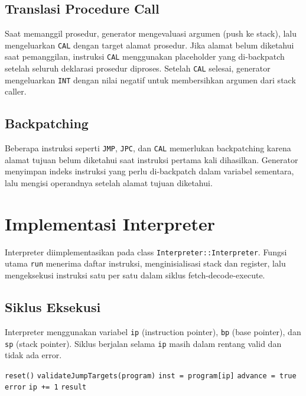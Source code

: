 \subsection{Translasi Procedure Call}
Saat memanggil prosedur, generator mengevaluasi argumen (push ke stack), lalu mengeluarkan \texttt{CAL} dengan target alamat prosedur. Jika alamat belum diketahui saat pemanggilan, instruksi \texttt{CAL} menggunakan placeholder yang di-backpatch setelah seluruh deklarasi prosedur diproses. Setelah \texttt{CAL} selesai, generator mengeluarkan \texttt{INT} dengan nilai negatif untuk membersihkan argumen dari stack caller.

\subsection{Backpatching}
Beberapa instruksi seperti \texttt{JMP}, \texttt{JPC}, dan \texttt{CAL} memerlukan backpatching karena alamat tujuan belum diketahui saat instruksi pertama kali dihasilkan. Generator menyimpan indeks instruksi yang perlu di-backpatch dalam variabel sementara, lalu mengisi operandnya setelah alamat tujuan diketahui.

\section{Implementasi Interpreter}
Interpreter diimplementasikan pada class \texttt{Interpreter::Interpreter}. Fungsi utama \texttt{run} menerima daftar instruksi, menginisialisasi stack dan register, lalu mengeksekusi instruksi satu per satu dalam siklus fetch-decode-execute.

\subsection{Siklus Eksekusi}
Interpreter menggunakan variabel \texttt{ip} (instruction pointer), \texttt{bp} (base pointer), dan \texttt{sp} (stack pointer). Siklus berjalan selama \texttt{ip} masih dalam rentang valid dan tidak ada error.

\begin{breakablealgorithm}
    \label{alg:fde-cycle}
    \begin{algorithmic}[1]
        \State \texttt{reset()}
        \State \texttt{validateJumpTargets(program)}
            \State \texttt{inst = program[ip]}
            \State \texttt{advance = true}
                \State \Return \texttt{error}
            \EndIf
                \State \texttt{ip += 1}
            \EndIf
        \EndWhile
        \State \Return \texttt{result}
        \EndProcedure
    \end{algorithmic}
\end{breakablealgorithm}

